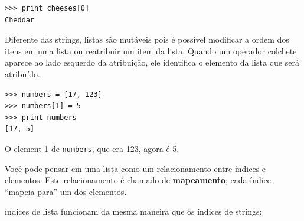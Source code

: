 \beforeverb
\begin{verbatim}
>>> print cheeses[0]
Cheddar
\end{verbatim}
\afterverb
%

Diferente das strings, listas são mutáveis pois é possível modificar a 
ordem dos itens em uma lista ou reatribuir um item da lista.
Quando um operador colchete aparece ao lado esquerdo da atribuição, 
ele identifica o elemento da lista que será atribuído.
%


\beforeverb
\begin{verbatim}
>>> numbers = [17, 123]
>>> numbers[1] = 5
>>> print numbers
[17, 5]
\end{verbatim}
\afterverb
%

O element 1 de {\tt numbers}, que era 123, agora é 5.


Você pode pensar em uma lista como um relacionamento entre índices e
elementos. Este relacionamento é chamado de {\bf mapeamento}; cada
índice ``mapeia para'' um dos elementos.


índices de lista funcionam da mesma maneira que os índices de strings:

